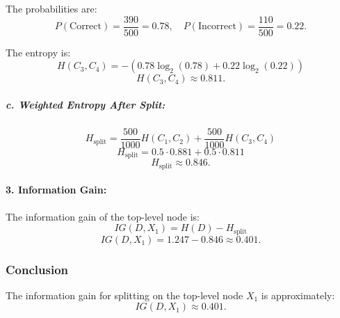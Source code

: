 \documentclass[10pt,a4paper]{article}
\begin{document}
The probabilities are:
\[
P(\text{Correct}) = \frac{390}{500} = 0.78, \quad P(\text{Incorrect}) = \frac{110}{500} = 0.22.
\]

The entropy is:
\[
H(C_3, C_4) = - \left( 0.78 \log_2(0.78) + 0.22 \log_2(0.22) \right)
\]
\[
H(C_3, C_4) \approx 0.811.
\]

\subparagraph{c. Weighted Entropy After Split:}
\[
H_{\text{split}} = \frac{500}{1000} H(C_1, C_2) + \frac{500}{1000} H(C_3, C_4)
\]
\[
H_{\text{split}} = 0.5 \cdot 0.881 + 0.5 \cdot 0.811
\]
\[
H_{\text{split}} \approx 0.846.
\]

\paragraph{3. Information Gain:}
The information gain of the top-level node is:
\[
IG(D, X_1) = H(D) - H_{\text{split}}
\]
\[
IG(D, X_1) = 1.247 - 0.846 \approx 0.401.
\]

\subsubsection*{Conclusion}
The information gain for splitting on the top-level node \(X_1\) is approximately:
\[
IG(D, X_1) \approx 0.401.
\]

\newpage
\end{document}
